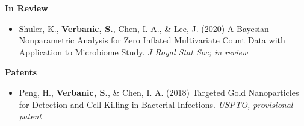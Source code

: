 \begin{vitae}
\textbf{In Review}
\begin{itemize}

\item Shuler, K., \textbf{Verbanic, S.}, Chen, I. A., \& Lee, J. (2020) A Bayesian Nonparametric Analysis for Zero Inflated Multivariate Count Data with Application to Microbiome Study. \textit{J Royal Stat Soc; in review}

\end{itemize}

\textbf{Patents}
\begin{itemize}
\item Peng, H., \textbf{Verbanic, S.}, \& Chen, I. A. (2018) Targeted Gold Nanoparticles for Detection and Cell Killing in Bacterial Infections. \textit{USPTO, provisional patent}
\end{itemize}



\end{vitae}